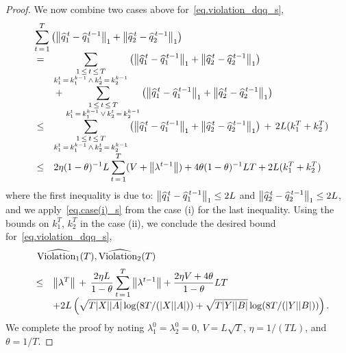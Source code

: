 \documentclass[12pt, final]{l4dc2023}
\begin{document}
\begin{proof}
	We now combine two cases above for~\eqref{eq.violation_dqq_s},
	\[
	\begin{array}{rcl}
	&& \!\!\!\! \!\!\!\! \!\!\!\!
	\displaystyle
	\sum_{t\,=\,1}^{T} \rbr{
		\norm{\hat q_1^{\,t} - \hat q_1^{\,t-1}}_1 
		+\norm{\hat q_2^{\,t}-\hat q_2^{\,t-1}}_1}
	\\[0.2cm]
	&=& \displaystyle
	\sum_{\substack{1\,\leq\,t\,\leq\,T\\k_1^t \,=\, k_1^{k-1}\,\wedge\, k_2^t \,=\, k_2^{k-1}}}\rbr{
		\norm{\hat q_1^{\,t} - \hat q_1^{\,t-1}}_1 
		+\norm{\hat q_2^{\,t}-\hat q_2^{\,t-1}}_1}
	\\[0.2cm]
	&&\displaystyle
	\,+\,
	\sum_{\substack{1\,\leq\,t\,\leq\,T\\k_1^t \,=\, k_1^{k-1}\,\vee\, k_2^t \,=\, k_2^{k-1}}}\rbr{
		\norm{\hat q_1^{\,t} - \hat q_1^{\,t-1}}_1 
		+\norm{\hat q_2^{\,t}-\hat q_2^{\,t-1}}_1}
	\\[0.2cm]
	&\leq& \displaystyle
	\sum_{\substack{1\,\leq\,t\,\leq\,T\\k_1^t \,=\, k_1^{k-1}\,\wedge\, k_2^t \,=\, k_2^{k-1}}}\rbr{
		\norm{\hat q_1^{\,t} - \hat q_1^{\,t-1}}_1 
		+\norm{\hat q_2^{\,t}-\hat q_2^{\,t-1}}_1}
	\,+\,2L (k_1^T+k_2^T)
	\\[0.2cm]
	&\leq&\displaystyle
	2\eta (1-\theta)^{-1} L\sum_{t\,=\,1}^{T} (V + \norm{\lambda^{t-1}}) + 4 \theta (1-\theta)^{-1}  LT +2L (k_1^T+k_2^T)
	\end{array}
	\]
	where the first inequality is due to: $\left\|{\widehat q_1^{\,t} - \widehat q_1^{\,t-1}}\right\|_1 \leq 2L$ and $\left\|{\widehat q_2^{\,t}-\widehat q_2^{\,t-1}}\right\|_1\leq 2L$, and we apply~\eqref{eq.case(i)_s} from the case (i) for the last inequality. Using the bounds on $k_1^T$, $k_2^T$ in the case (ii), we conclude the desired bound for~\eqref{eq.violation_dqq_s},
	\[
	\begin{array}{rcl}
	&& \!\!\!\! \!\!\!\! \!\!
	\displaystyle {\hat{\text{\normalfont Violation}_1}(T)}, {\hat{\text{\normalfont Violation}_2}(T)}
	\\[0.2cm]
	&\leq&\displaystyle
	\norm{\lambda^T}
	\,+\, 
	\frac{2\eta L}{1-\theta}
	\sum_{t\,=\,1}^{T} \norm{\lambda^{t-1}} + \frac{2\eta V+4 \theta}{1-\theta}  LT 
	\\[0.2cm]
	&&\displaystyle+2L 
	\rbr{\sqrt{ T|X||A|}\log (8T/(|X||A|))+ \sqrt{ T|Y||B|}\log (8T/(|Y||B|))}.
	\end{array}
	\]
	We complete the proof by noting $\lambda_1^0=\lambda_2^0=0$, $V=L\sqrt{T}$, $\eta = 1/(TL)$, and $\theta = 1/T$.
\end{proof}
\end{document}
